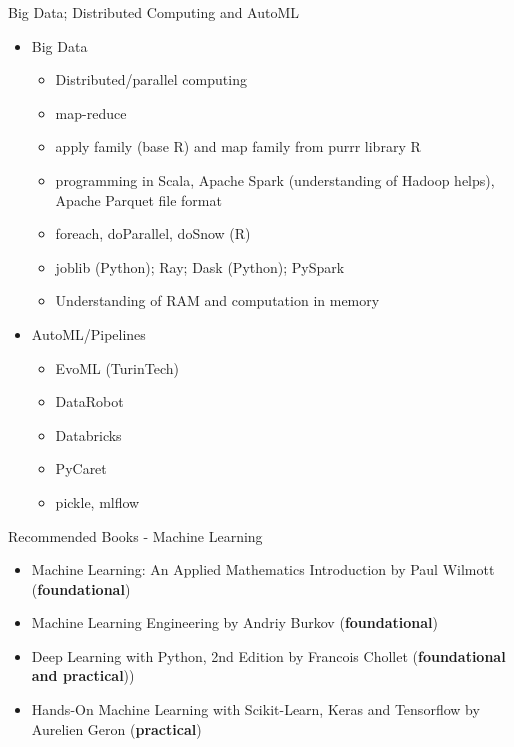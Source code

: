\documentclass[compress,brown]{beamer}
\begin{document}
\begin{frame}{Big Data; Distributed Computing and AutoML}
\begin{itemize}
	\item Big Data
	\begin{itemize}
		\item Distributed/parallel computing
		\item map-reduce
		\item apply family (base R) and map family from purrr library R
		\item programming in Scala, Apache Spark (understanding of Hadoop helps), Apache Parquet file format
		\item foreach, doParallel, doSnow (R)
		\item joblib (Python); Ray; Dask (Python); PySpark
		\item Understanding of RAM and computation in memory
	\end{itemize}
	\item AutoML/Pipelines
		\begin{itemize}
			\item EvoML (TurinTech)
			\item DataRobot
			\item Databricks
			\item PyCaret
			\item pickle, mlflow
		\end{itemize}
\end{itemize}
\end{frame}

\begin{frame}{Recommended Books - Machine Learning}
\begin{itemize}
	\item Machine Learning: An Applied Mathematics Introduction by Paul Wilmott (\textbf{foundational})
	\item Machine Learning Engineering by Andriy Burkov (\textbf{foundational})
	\item Deep Learning with Python, 2nd Edition by Francois Chollet (\textbf{foundational and practical}))
	\item Hands-On Machine Learning with Scikit-Learn, Keras and Tensorflow by Aurelien Geron (\textbf{practical})

\end{itemize}
\end{frame}
\end{document}
